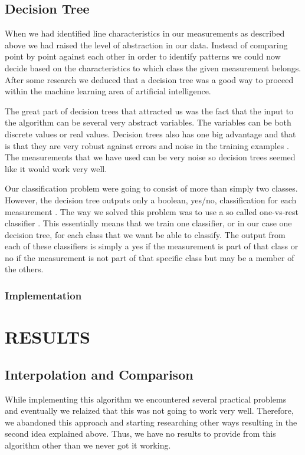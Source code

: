 \documentclass[a4paper, 10pt, conference]{ieeeconf}      %
\begin{document}
\subsection{Decision Tree}
When we had identified line characteristics in our measurements as described above we had raised the level of abstraction in our data. Instead of comparing point by point against each other in order to identify patterns we could now decide based on the characteristics to which class the given measurement belongs. After some research we deduced that a decision tree was a good way to proceed within the machine learning area of artificial intelligence.

The great part of decision trees that attracted us was the fact that the input to the algorithm can be several very abstract variables. The variables can be both discrete values or real values. Decision trees also has one big advantage and that is that they are very robust against errors and noise in the training examples \cite{ml3}. The measurements that we have used can be very noise so decision trees seemed like it would work very well.

Our classification problem were going to consist of more than simply two classes. However, the decision tree outputs only a boolean, yes/no, classification for each measurement \cite{ml3}. The way we solved this problem was to use a so called one-vs-rest classifier \cite{praml}. This essentially means that we train one classifier, or in our case one decision tree, for each class that we want be able to classify. The output from each of these classifiers is simply a yes if the measurement is part of that class or no if the measurement is not part of that specific class but may be a member of the others.

\subsubsection{Implementation}

\section{RESULTS}

\subsection{Interpolation and Comparison}
While implementing this algorithm we encountered several practical problems and eventually we relaized that this was not going to work very well. Therefore, we abandoned this approach and starting researching other ways resulting in the second idea explained above. Thus, we have no results to provide from this algorithm other than we never got it working.
\end{document}
